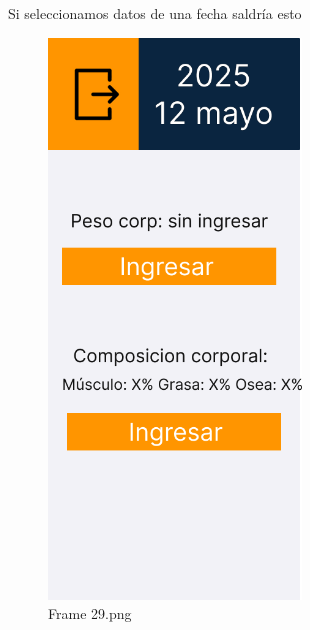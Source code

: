 Si seleccionamos datos de una fecha saldría esto
\begin{figure}[H]
   \centering
    \includegraphics[width=0.6\textwidth]{fotos/Frame 29.png}
    \caption{Frame 29.png}
    \label{fig:Frame_29}
\end{figure}

